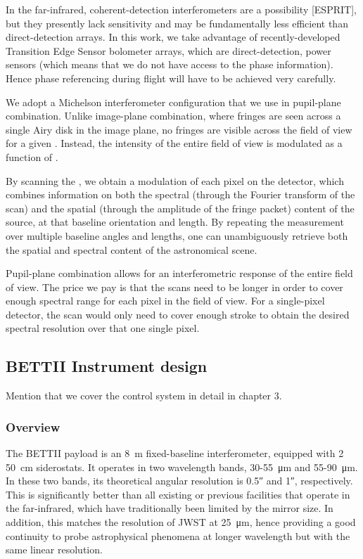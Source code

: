In the far-infrared, coherent-detection interferometers are a possibility [ESPRIT], but they presently lack sensitivity and may be fundamentally less efficient than direct-detection arrays. In this work, we take advantage of recently-developed Transition Edge Sensor bolometer arrays, which are direct-detection, power sensors (which means that we do not have access to the phase information). Hence phase referencing during flight will have to be achieved very carefully.

We adopt a Michelson interferometer configuration that we use in pupil-plane combination. Unlike image-plane combination, where fringes are seen across a single Airy disk in the image plane, no fringes are visible across the field of view for a given \OPD. Instead, the intensity of the entire field of view is modulated as a function of \OPD. 

By scanning the \OPD, we obtain a modulation of each pixel on the detector, which combines information on both the spectral (through the Fourier transform of the scan) and the spatial (through the amplitude of the fringe packet) content of the source, at that baseline orientation and length. By repeating the measurement over multiple baseline angles and lengths, one can unambiguously retrieve both the spatial and spectral content of the astronomical scene. 

Pupil-plane combination allows for an interferometric response of the entire field of view. The price we pay is that the \OPD scans need to be longer in order to cover enough spectral range for each pixel in the field of view. For a single-pixel detector, the \OPD scan would only need to cover enough stroke to obtain the desired spectral resolution over that one single pixel.


\subsection{BETTII Instrument design}

Mention that we cover the control system in detail in chapter 3.

\subsubsection{Overview}

The BETTII payload is an \SI{8}{\meter} fixed-baseline interferometer, equipped with 2 \SI{50}{\centi\meter} siderostats. It operates in two wavelength bands, 30-55~\si{\micro\meter} and 55-90~\si{\micro\meter}. In these two bands, its theoretical angular resolution is \ang{;;0.5} and \ang{;;1}, respectively. This is significantly better than all existing or previous facilities that operate in the far-infrared, which have traditionally been limited by the mirror size. In addition, this matches the resolution of JWST at \SI{25}{\micro\meter}, hence providing a good continuity to probe astrophysical phenomena at longer wavelength but with the same linear resolution.


